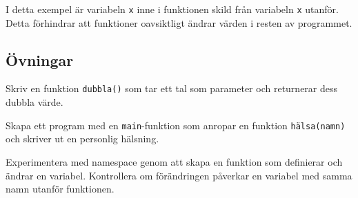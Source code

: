 I detta exempel är variabeln \texttt{x} inne i funktionen skild från variabeln \texttt{x} utanför. Detta förhindrar att funktioner oavsiktligt ändrar värden i resten av programmet.


\subsection{Övningar}
\begin{exercise}
Skriv en funktion \texttt{dubbla()} som tar ett tal som parameter och returnerar dess dubbla värde.
\end{exercise}

\begin{exercise}
Skapa ett program med en \texttt{main}-funktion som anropar en funktion \texttt{hälsa(namn)} och skriver ut en personlig hälsning.
\end{exercise}

\begin{exercise}
Experimentera med namespace genom att skapa en funktion som definierar och ändrar en variabel. Kontrollera om förändringen påverkar en variabel med samma namn utanför funktionen.
\end{exercise}

